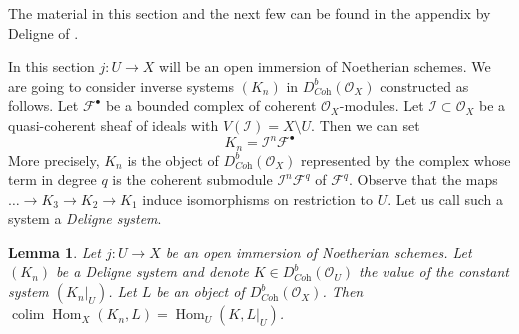 \documentclass{stacks-project}
\theoremstyle{plain}
\newtheorem{lemma}[subsection]{Lemma}
\theoremstyle{definition}
\theoremstyle{remark}
\numberwithin{equation}{subsection}
\def\colim{\mathop{\mathrm{colim}}\nolimits}
\def\Hom{\mathop{\mathrm{Hom}}\nolimits}
\begin{document}
\noindent
The material in this section and the next few can be found
in the appendix by Deligne of \cite{RD}.

\medskip\noindent
In this section $j : U \to X$ will be an open immersion of Noetherian schemes.
We are going to consider inverse systems $(K_n)$ in
$D^b_{\textit{Coh}}(\mathcal{O}_X)$ constructed as follows.
Let $\mathcal{F}^\bullet$ be a bounded complex of coherent
$\mathcal{O}_X$-modules. Let $\mathcal{I} \subset \mathcal{O}_X$
be a quasi-coherent sheaf of ideals with $V(\mathcal{I}) = X \setminus U$.
Then we can set
$$
K_n = \mathcal{I}^n\mathcal{F}^\bullet
$$
More precisely, $K_n$ is the object of $D^b_{\textit{Coh}}(\mathcal{O}_X)$
represented by the complex whose term in degree $q$
is the coherent submodule $\mathcal{I}^n\mathcal{F}^q$ of $\mathcal{F}^q$.
Observe that the maps $\ldots \to K_3 \to K_2 \to K_1$ induce isomorphisms
on restriction to $U$. Let us call such a system a {\it Deligne system}.

\begin{lemma}
\label{lemma-lift-map}
Let $j : U \to X$ be an open immersion of Noetherian schemes.
Let $(K_n)$ be a Deligne system and denote
$K \in D^b_{\textit{Coh}}(\mathcal{O}_U)$ the value
of the constant system $(K_n|_U)$. Let $L$ be an object of
$D^b_{\textit{Coh}}(\mathcal{O}_X)$.
Then $\colim \Hom_X(K_n, L) = \Hom_U(K, L|_U)$.
\end{lemma}
\end{document}
